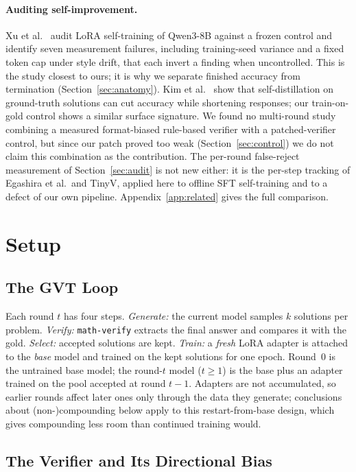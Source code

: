 \documentclass[runningheads]{llncs}
\begin{document}
\paragraph{Auditing self-improvement.}
Xu et al.~\cite{ref_phantom} audit LoRA self-training of Qwen3-8B against a
frozen control and identify seven measurement failures, including training-seed
variance and a fixed token cap under style drift, that each invert a finding
when uncontrolled. This is the study closest to ours; it is why we separate
finished accuracy from termination (Section~\ref{sec:anatomy}). Kim et
al.~\cite{ref_selfdistill} show that self-distillation on ground-truth solutions
can cut accuracy while shortening responses; our train-on-gold control shows a
similar surface signature. We found no multi-round study combining a measured
format-biased rule-based verifier with a patched-verifier control, but since our
patch proved too weak (Section~\ref{sec:control}) we do not claim this
combination as the contribution. The per-round false-reject measurement of
Section~\ref{sec:audit} is not new either: it is the per-step tracking of
Egashira et al.\ and TinyV, applied here to offline SFT self-training and to
a defect of our own pipeline. Appendix~\ref{app:related} gives the full
comparison.

\section{Setup}
\label{sec:setup}

\subsection{The GVT Loop}
\label{sec:loop}

Each round $t$ has four steps. \emph{Generate:} the current model samples $k$
solutions per problem. \emph{Verify:} \texttt{math-verify} extracts the final
answer and compares it with the gold. \emph{Select:} accepted solutions are kept.
\emph{Train:} a \emph{fresh} LoRA adapter is attached to the \emph{base} model and
trained on the kept solutions for one epoch. Round~0 is the untrained base model;
the round-$t$ model ($t\ge1$) is the base plus an adapter trained on the pool
accepted at round $t-1$. Adapters are not accumulated, so earlier rounds affect
later ones only through the data they generate; conclusions about
(non-)compounding below apply to this restart-from-base design, which gives
compounding less room than continued training would.

\subsection{The Verifier and Its Directional Bias}
\label{sec:verifier}
\end{document}
